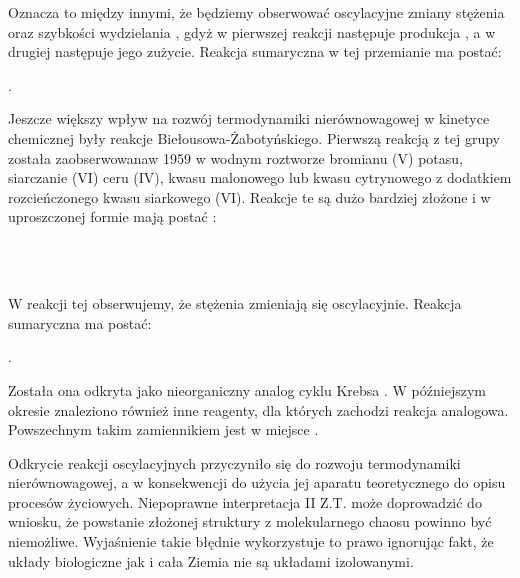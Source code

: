 \documentclass[10pt, a4paper, twoside, onecolumn]{article}
\numberwithin{equation}{section}
\begin{document}
	Oznacza to między innymi, że będziemy obserwować oscylacyjne zmiany stężenia  oraz szybkości wydzielania , gdyż w pierwszej reakcji następuje produkcja , a w drugiej następuje jego zużycie. Reakcja sumaryczna w tej przemianie ma postać: 
	\begin{center}
		.
	\end{center}
	Jeszcze większy wpływ na rozwój termodynamiki nierównowagowej w kinetyce chemicznej były reakcje Biełousowa-Żabotyńskiego. Pierwszą reakcją z tej grupy została zaobserwowanaw 1959 w wodnym roztworze bromianu (V) potasu, siarczanie (VI) ceru (IV), kwasu malonowego lub kwasu cytrynowego z dodatkiem rozcieńczonego kwasu siarkowego (VI). Reakcje te są dużo bardziej złożone i w uproszczonej formie mają postać \cite{orlik}:
	\begin{center}
		 \\
		 \\
	\end{center}
	W reakcji tej obserwujemy, że stężenia  zmieniają się oscylacyjnie. Reakcja sumaryczna ma postać: 
	\begin{center}
		.
	\end{center}
	Została ona odkryta jako nieorganiczny analog cyklu Krebsa \cite{belousov_hist}. W późniejszym okresie znaleziono również inne reagenty, dla których zachodzi reakcja analogowa. Powszechnym takim zamiennikiem jest  w miejsce . \par
	Odkrycie reakcji oscylacyjnych przyczyniło się do rozwoju termodynamiki nierównowagowej, a w konsekwencji do użycia jej aparatu teoretycznego do opisu procesów życiowych. Niepoprawne interpretacja II Z.T. może doprowadzić do wniosku, że powstanie złożonej struktury z molekularnego chaosu powinno być niemożliwe. Wyjaśnienie takie błędnie wykorzystuje to prawo ignorując fakt, że układy biologiczne jak i cała Ziemia nie są układami izolowanymi. 
	
\end{document}
